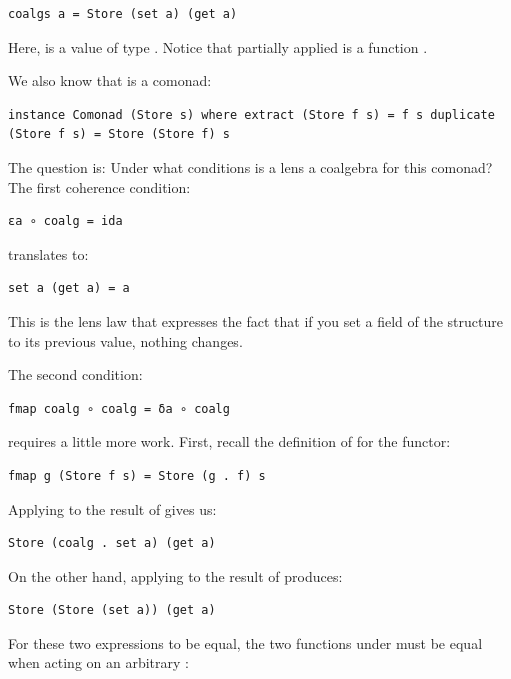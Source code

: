 \begin{verbatim}
coalgs a = Store (set a) (get a)
\end{verbatim}

Here,  is a value of type . Notice that partially
applied  is a function .

We also know that  is a comonad:

\begin{verbatim}
instance Comonad (Store s) where extract (Store f s) = f s duplicate (Store f s) = Store (Store f) s
\end{verbatim}

The question is: Under what conditions is a lens a coalgebra for this
comonad? The first coherence condition:

\begin{verbatim}
εa ∘ coalg = ida
\end{verbatim}

translates to:

\begin{verbatim}
set a (get a) = a
\end{verbatim}

This is the lens law that expresses the fact that if you set a field of
the structure  to its previous value, nothing changes.

The second condition:

\begin{verbatim}
fmap coalg ∘ coalg = δa ∘ coalg
\end{verbatim}

requires a little more work. First, recall the definition of
 for the  functor:

\begin{verbatim}
fmap g (Store f s) = Store (g . f) s
\end{verbatim}

Applying  to the result of  gives us:

\begin{verbatim}
Store (coalg . set a) (get a)
\end{verbatim}

On the other hand, applying  to the result of
 produces:

\begin{verbatim}
Store (Store (set a)) (get a)
\end{verbatim}

For these two expressions to be equal, the two functions under
 must be equal when acting on an arbitrary :

